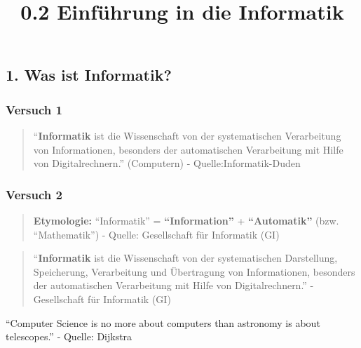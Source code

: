\documentclass[
  11pt,
  a4paper,
  DIV=11,
  numbers=noendperiod]{scrartcl}
\title{0.2 Einführung in die Informatik}
\author{}
\date{}
\begin{document}
\maketitle


\subsection{1. Was ist Informatik?}\label{was-ist-informatik}

\subsubsection{Versuch 1}\label{versuch-1}

\begin{quote}
``\textbf{Informatik} ist die Wissenschaft von der systematischen
Verarbeitung von Informationen, besonders der automatischen Verarbeitung
mit Hilfe von Digitalrechnern.'' (Computern) - Quelle:Informatik-Duden
\end{quote}

\subsubsection{Versuch 2}\label{versuch-2}

\begin{quote}
\textbf{Etymologie:} ``Informatik'' = \textbf{``Information''} +
\textbf{``Automatik''} (bzw. ``Mathematik'') - Quelle: Gesellschaft für
Informatik (GI)
\end{quote}

\begin{quote}
``\textbf{Informatik} ist die Wissenschaft von der systematischen
Darstellung, Speicherung, Verarbeitung und Übertragung von
Informationen, besonders der automatischen Verarbeitung mit Hilfe von
Digitalrechnern.'' - Gesellschaft für Informatik (GI)
\end{quote}

\begin{tcolorbox}[enhanced jigsaw, breakable, coltitle=black, colbacktitle=quarto-callout-caution-color!10!white, colback=white, arc=.35mm, colframe=quarto-callout-caution-color-frame, titlerule=0mm, leftrule=.75mm, title=\textcolor{quarto-callout-caution-color}{\faFire}\hspace{0.5em}{ACHTUNG}, toprule=.15mm, bottomtitle=1mm, rightrule=.15mm, bottomrule=.15mm, toptitle=1mm, opacityback=0, left=2mm, opacitybacktitle=0.6]

``Computer Science is no more about computers than astronomy is about
telescopes.'' - Quelle: Dijkstra

\end{tcolorbox}
\end{document}
